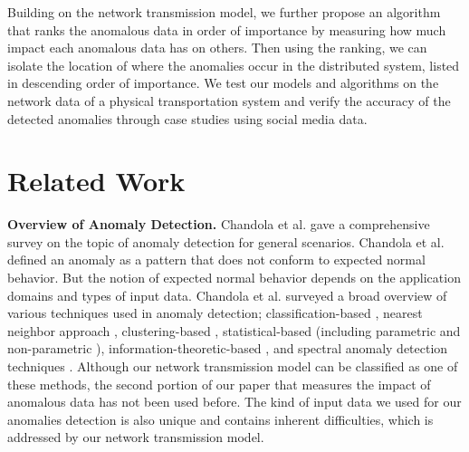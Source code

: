 \documentclass[conference]{IEEEtran.1.8}
\begin{document}
Building on the network transmission model, we further propose an algorithm that ranks the anomalous data in order of importance by measuring how much impact each anomalous data has on others. Then using the ranking, we can isolate the location of where the anomalies occur in the distributed system, listed in descending order of importance. We test our models and algorithms on the network data of a physical transportation system and verify the accuracy of the detected anomalies through case studies using social media data.


\section{Related Work}
\label{sec:related}



\textbf{Overview of Anomaly Detection.} Chandola et al. \cite{Chandola2009} gave a comprehensive survey on the topic of anomaly detection for general scenarios. Chandola et al. defined an anomaly as a pattern that does not conform to expected normal behavior. But the notion of expected normal behavior depends on the application domains and types of input data. Chandola et al. surveyed a broad overview of various techniques used in anomaly detection; classification-based \cite{Stefano2000, Barbara2001}, nearest neighbor approach \cite{Otey2006}, clustering-based \cite{He2003}, statistical-based (including parametric \cite{Eskin2000} and non-parametric \cite{Chow2002}), information-theoretic-based \cite{Ando2007}, and spectral anomaly detection techniques \cite{Agovic2009}. Although our network transmission model can be classified as one of these methods, the second portion of our paper that measures the impact of anomalous data has not been used before. The kind of input data we used for our anomalies detection is also unique and contains inherent difficulties, which is addressed by our network transmission model.
\end{document}
